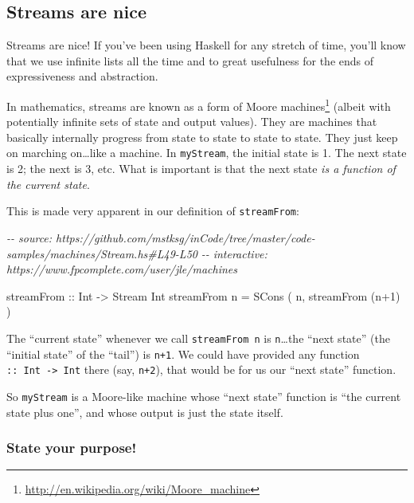 \documentclass[]{article}
\newenvironment{Shaded}{}{}
\newcommand{\CommentTok}[1]{\textcolor[rgb]{0.38,0.63,0.69}{\textit{#1}}}
\newcommand{\DataTypeTok}[1]{\textcolor[rgb]{0.56,0.13,0.00}{#1}}
\newcommand{\DecValTok}[1]{\textcolor[rgb]{0.25,0.63,0.44}{#1}}
\newcommand{\NormalTok}[1]{#1}
\newcommand{\OperatorTok}[1]{\textcolor[rgb]{0.40,0.40,0.40}{#1}}
\newcommand{\OtherTok}[1]{\textcolor[rgb]{0.00,0.44,0.13}{#1}}
\renewcommand{\href}[2]{#2\footnote{\url{#1}}}
\begin{document}
\subsection{Streams are nice}\label{streams-are-nice}

Streams are nice! If you've been using Haskell for any stretch of time, you'll
know that we use infinite lists all the time and to great usefulness for the
ends of expressiveness and abstraction.

In mathematics, streams are known as a form of
\href{http://en.wikipedia.org/wiki/Moore_machine}{Moore machines} (albeit with
potentially infinite sets of state and output values). They are machines that
basically internally progress from state to state to state to state. They just
keep on marching on\ldots like a machine. In \texttt{myStream}, the initial
state is 1. The next state is 2; the next is 3, etc. What is important is that
the next state \emph{is a function of the current state}.

This is made very apparent in our definition of \texttt{streamFrom}:

\begin{Shaded}
\begin{Highlighting}[]
\CommentTok{{-}{-} source: https://github.com/mstksg/inCode/tree/master/code{-}samples/machines/Stream.hs\#L49{-}L50}
\CommentTok{{-}{-} interactive: https://www.fpcomplete.com/user/jle/machines}

\OtherTok{    streamFrom ::} \DataTypeTok{Int} \OtherTok{{-}\textgreater{}} \DataTypeTok{Stream} \DataTypeTok{Int}
\NormalTok{    streamFrom n }\OtherTok{=} \DataTypeTok{SCons}\NormalTok{ ( n, streamFrom (n}\OperatorTok{+}\DecValTok{1}\NormalTok{) )}
\end{Highlighting}
\end{Shaded}

The ``current state'' whenever we call \texttt{streamFrom\ n} is
\texttt{n}\ldots the ``next state'' (the ``initial state'' of the ``tail'') is
\texttt{n+1}. We could have provided any function
\texttt{::\ Int\ -\textgreater{}\ Int} there (say, \texttt{n+2}), that would be
for us our ``next state'' function.

So \texttt{myStream} is a Moore-like machine whose ``next state'' function is
``the current state plus one'', and whose output is just the state itself.

\subsubsection{State your purpose!}\label{state-your-purpose}
\end{document}
